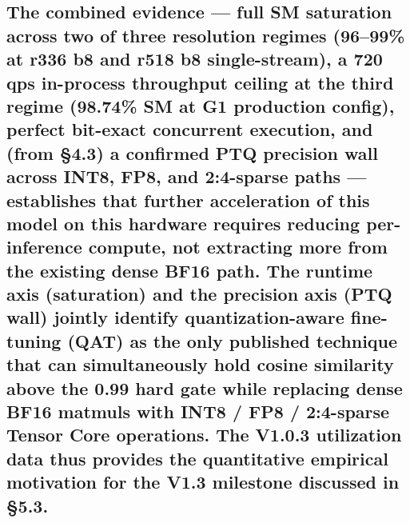 \documentclass[
]{article}
\begin{document}
\subsection{\texorpdfstring{The combined evidence --- full SM saturation
across two of three resolution regimes (96--99\% at r336 b8 and r518 b8
single-stream), a 720 qps in-process throughput ceiling at the third
regime (98.74\% SM at G1 production config), perfect bit-exact
concurrent execution, and (from §4.3) a confirmed PTQ precision wall
across INT8, FP8, and 2:4-sparse paths --- establishes that further
acceleration of this model on this hardware requires \textbf{reducing
per-inference compute}, not extracting more from the existing dense BF16
path. The runtime axis (saturation) and the precision axis (PTQ wall)
jointly identify quantization-aware fine-tuning (QAT) as the only
published technique that can simultaneously hold cosine similarity above
the 0.99 hard gate while replacing dense BF16 matmuls with INT8 / FP8 /
2:4-sparse Tensor Core operations. The V1.0.3 utilization data thus
provides the quantitative empirical motivation for the V1.3 milestone
discussed in
§5.3.}{The combined evidence --- full SM saturation across two of three resolution regimes (96--99\% at r336 b8 and r518 b8 single-stream), a 720 qps in-process throughput ceiling at the third regime (98.74\% SM at G1 production config), perfect bit-exact concurrent execution, and (from §4.3) a confirmed PTQ precision wall across INT8, FP8, and 2:4-sparse paths --- establishes that further acceleration of this model on this hardware requires reducing per-inference compute, not extracting more from the existing dense BF16 path. The runtime axis (saturation) and the precision axis (PTQ wall) jointly identify quantization-aware fine-tuning (QAT) as the only published technique that can simultaneously hold cosine similarity above the 0.99 hard gate while replacing dense BF16 matmuls with INT8 / FP8 / 2:4-sparse Tensor Core operations. The V1.0.3 utilization data thus provides the quantitative empirical motivation for the V1.3 milestone discussed in §5.3.}}\label{the-combined-evidence--full-sm-saturation-across-two-of-three-resolution-regimes-9699-at-r336-b8-and-r518-b8-single-stream-a-720-qps-in-process-throughput-ceiling-at-the-third-regime-9874-sm-at-g1-production-config-perfect-bit-exact-concurrent-execution-and-from-43-a-confirmed-ptq-precision-wall-across-int8-fp8-and-24-sparse-paths--establishes-that-further-acceleration-of-this-model-on-this-hardware-requires-reducing-per-inference-compute-not-extracting-more-from-the-existing-dense-bf16-path-the-runtime-axis-saturation-and-the-precision-axis-ptq-wall-jointly-identify-quantization-aware-fine-tuning-qat-as-the-only-published-technique-that-can-simultaneously-hold-cosine-similarity-above-the-099-hard-gate-while-replacing-dense-bf16-matmuls-with-int8--fp8--24-sparse-tensor-core-operations-the-v103-utilization-data-thus-provides-the-quantitative-empirical-motivation-for-the-v13-milestone-discussed-in-53}
\end{document}
